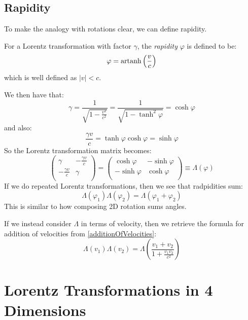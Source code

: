 \documentclass[../main.tex]{subfiles}
\begin{document}
\subsection{Rapidity}
  To make the analogy with rotations clear, we can define rapidity.
  \begin{definition}[Rapidity]
    For a Lorentz transformation with factor $\gamma$, the \textit{rapidity} $\varphi$ is defined to be:
    \[
      \varphi = \operatorname{artanh} \left(\frac{v}{c}\right)
    \]
    which is well defined as $|v| < c$.
  \end{definition}
  We then have that:
  \[
    \gamma = \frac{1}{\sqrt{1 - \frac{v^2}{c^2}}} = \frac{1}{\sqrt{1 - \tanh^2 \varphi}} = \cosh \varphi
  \]
  and also:
  \[
    \frac{\gamma v}{c} = \tanh \varphi \cosh \varphi = \sinh \varphi
  \]
  So the Lorentz transformation matrix becomes:
  \[
    \begin{pmatrix}
    \gamma & - \frac{\gamma v}{c} \\
    - \frac{\gamma v}{c} & \gamma \\
    \end{pmatrix} = \begin{pmatrix}
    \cosh \varphi & -\sinh \varphi \\
    -\sinh \varphi &  \cosh \varphi \\
    \end{pmatrix} \equiv \Lambda(\varphi)
  \]
  If we do repeated Lorentz transformations, then we see that radpidities sum:
  \[
    \Lambda(\varphi_1)\Lambda(\varphi_2) = \Lambda(\varphi_1 + \varphi_2)
  \]
  This is similar to how composing 2D rotation sums angles.

  If we instead consider $\Lambda$ in terms of velocity, then we retrieve the formula for addition of velocities from \cref{additionOfVelocities}:
  \[
    \Lambda(v_1)\Lambda(v_2) = \Lambda\left(\frac{v_1 + v_2}{1 + \frac{v_1 v_2}{c^2}}\right)
  \]
\section{Lorentz Transformations in 4 Dimensions}
\end{document}
